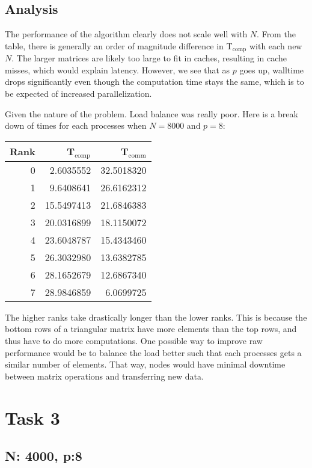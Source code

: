 \documentclass[11pt]{article}
\begin{document}
\subsection{Analysis}
\label{sec:org97f277c}

The performance of the algorithm clearly does not scale well with \(N\). From the table, there is generally an order of magnitude difference in T\(_{\text{comp}}\) with each new \(N\). The larger matrices are likely too large to fit in caches, resulting in cache misses, which would explain latency. However, we see that as \(p\) goes up, walltime drops significantly even though the computation time stays the same, which is to be expected of increased parallelization. 

Given the nature of the problem. Load balance was really poor. Here is a break down of times for each processes when \(N = 8000\) and \(p = 8\):

\begin{center}
\begin{tabular}{rrr}
Rank & T\(_{\text{comp}}\) & T\(_{\text{comm}}\)\\
\hline
0 & 2.6035552 & 32.5018320\\
1 & 9.6408641 & 26.6162312\\
2 & 15.5497413 & 21.6846383\\
3 & 20.0316899 & 18.1150072\\
4 & 23.6048787 & 15.4343460\\
5 & 26.3032980 & 13.6382785\\
6 & 28.1652679 & 12.6867340\\
7 & 28.9846859 & 6.0699725\\
\end{tabular}
\end{center}

The higher ranks take drastically longer than the lower ranks. This is because the bottom rows of a triangular matrix have more elements than the top rows, and thus have to do more computations. One possible way to improve raw performance would be to balance the load better such that each processes gets a similar number of elements. That way, nodes would have minimal downtime between matrix operations and transferring new data.

\section{Task 3}
\label{sec:orgcaebc72}

\subsection{N: 4000, p:8}
\label{sec:org8b21ed7}
\end{document}
